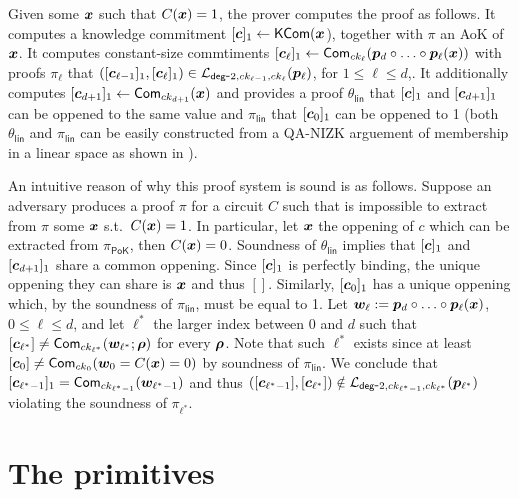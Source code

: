 Given some ${\boldsymbol{x}}$ such that $C({\boldsymbol{x}})= 1$, the prover computes the proof as follows. It computes a knowledge commitment $[{\boldsymbol{c}}]_1\gets\mathsf{KCom}({\boldsymbol{x}}$), together with $\pi$ an AoK of ${\boldsymbol{x}}$. It computes constant-size commtiments $[{\boldsymbol{c}}_\ell]_1\gets\mathsf{Com}_{ck_\ell}({\boldsymbol{p}}_d\circ\ldots\circ{\boldsymbol{p}}_\ell({\boldsymbol{x}}))$  with proofs $\pi_\ell$ that $([{\boldsymbol{c}}_{\ell-1}]_1,[{\boldsymbol{c}}_\ell]_1)\in\mathcal{L}_{\mathsf{deg}\mbox{-}2,ck_{\ell-1},ck_\ell}({\boldsymbol{p}}_\ell)$, for $1\leq \ell\leq d$,. It additionally computes $[{\boldsymbol{c}}_{d+1}]_1\gets\mathsf{Com}_{ck_{d+1}}({\boldsymbol{x}})$ and provides a proof $\theta_\mathsf{lin}$ that $[{\boldsymbol{c}}]_1$ and $[{\boldsymbol{c}}_{d+1}]_1$ can be oppened to the same value and $\pi_\mathsf{lin}$ that $[{\boldsymbol{c}}_0]_1$  can be oppened to 1 (both $\theta_\mathsf{lin}$ and $\pi_\mathsf{lin}$ can be easily constructed from a QA-NIZK arguement of membership in a linear space as shown in \cite{AC:GonHevRaf15}).

An intuitive reason of why this proof system is sound is as follows. Suppose an adversary produces a proof $\pi$ for a circuit $C$ such that is impossible to extract from $\pi$ some ${\boldsymbol{x}}$ s.t.~$C({\boldsymbol{x}})=1$. In particular, let ${\boldsymbol{x}}$ the oppening of $c$ which can be extracted from $\pi_\mathsf{PoK}$, then $C({\boldsymbol{x}})=0$. Soundness of $\theta_\mathsf{lin}$ implies that $[{\boldsymbol{c}}]_1$ and $[{\boldsymbol{c}}_{d+1}]_1$ share a common oppening. Since $[{\boldsymbol{c}}]_1$ is perfectly binding, the unique oppening they can share is ${\boldsymbol{x}}$ and thus $[]$. Similarly, $[{\boldsymbol{c}}_0]_1$ has a unique oppening which, by the soundness of $\pi_\mathsf{lin}$, must be equal to 1.
Let ${\boldsymbol{w}}_\ell := {\boldsymbol{p}}_d\circ\ldots\circ {\boldsymbol{p}}_\ell({\boldsymbol{x}})$, $0\leq\ell\leq d$, and let $\ell^*$ the larger index between $0$ and $d$ such that $[{\boldsymbol{c}}_{\ell^*}]\neq\mathsf{Com}_{ck_{\ell^*}}({\boldsymbol{w}}_{\ell^*};{\boldsymbol{\rho}})$ for every ${\boldsymbol{\rho}}$. Note that such $\ell^*$ exists since at least $[{\boldsymbol{c}}_0]\neq\mathsf{Com}_{ck_0}({\boldsymbol{w}}_0 = C({\boldsymbol{x}})=0)$ by soundness of $\pi_\mathsf{lin}$. We conclude that $[{\boldsymbol{c}}_{\ell^*-1}]_1=\mathsf{Com}_{ck_{\ell^*-1}}({\boldsymbol{w}}_{\ell^*-1})$ and thus $([{\boldsymbol{c}}_{\ell^*-1}],[{\boldsymbol{c}}_{\ell^*}])\notin\mathcal{L}_{\mathsf{deg}\mbox{-}2,ck_{\ell^*-1},ck_{\ell^*}}({\boldsymbol{p}}_{\ell^*})$ violating the soundness of $\pi_{\ell^*}$.
 
\section{The primitives}
